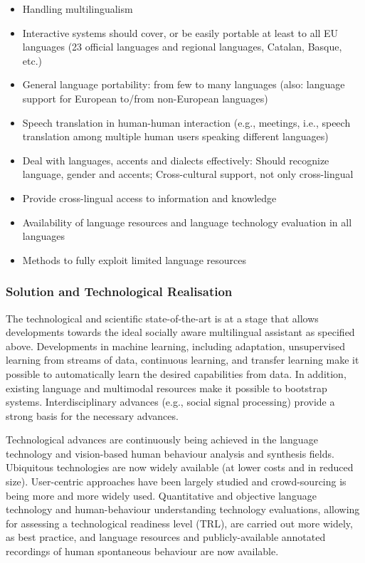 \documentclass[10pt, plain]{../../metanetpaper}
\begin{document}
\begin{multicols}{2}
\begin{itemize}
\item Handling multilingualism
\item Interactive systems should cover, or be easily portable at least to all EU languages (23 official languages and regional languages, Catalan, Basque, etc.)
\item General language portability:  from few to many languages (also: language support for European to/from non-European languages)
\item Speech translation in human-human interaction (e.g., meetings, i.e., speech translation among multiple human users speaking different languages)
\item Deal with languages, accents and dialects effectively: Should recognize language, gender and accents; Cross-cultural support, not only cross-lingual
\item Provide cross-lingual access to information and knowledge
\item Availability of language resources and language technology evaluation in all languages
\item Methods to fully exploit limited language resources
\end{itemize}

\subsubsection{Solution and Technological Realisation}
\label{sec:solut-techn-real-pt3}

The technological and scientific state-of-the-art is at a stage that allows developments towards the ideal socially aware multilingual assistant as specified above. Developments in machine learning, including adaptation, unsupervised learning from streams of data, continuous learning, and transfer learning make it possible to automatically learn the desired capabilities from data. In addition, existing language and multimodal resources make it possible to bootstrap systems. Interdisciplinary advances (e.g., social signal processing) provide a strong basis for the necessary advances.
 
Technological advances are continuously being achieved in the language technology and vision-based human behaviour analysis and synthesis fields. Ubiquitous technologies are now widely available (at lower costs and in reduced size). User-centric approaches have been largely studied and crowd-sourcing is being more and more widely used. Quantitative and objective language technology and human-behaviour understanding technology evaluations, allowing for assessing a technological readiness level (TRL), are carried out more widely, as best practice, and language resources and publicly-available annotated recordings of human spontaneous behaviour are now available.
 

\end{multicols}
\end{document}
